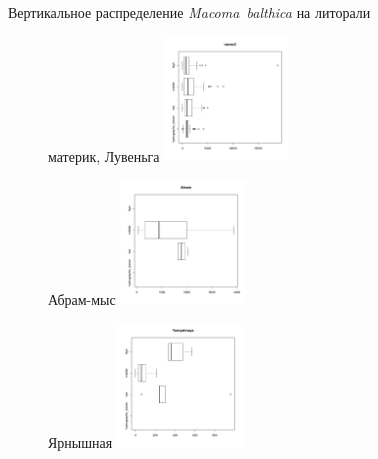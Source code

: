 \documentclass{beamer}
\begin{document}
\begin{frame}{Вертикальное распределение {\it Macoma~balthica} на литорали}
\begin{figure}
	\begin{minipage}[b]{.3\linewidth}
	\begin{center}
\tiny{материк, Лувеньга}
\includegraphics[width=33mm]{./Vertikal_strukture/razrez2_vertical.pdf}
	\end{center}
	\end{minipage}
	\hfil %
	\begin{minipage}[b]{.3\linewidth}
	\begin{center}
\tiny{Абрам-мыс}
\includegraphics[width=33mm]{./Vertikal_strukture/Abram_vertical.pdf}
	\end{center}
	\end{minipage}
	\hfil %
	\begin{minipage}[b]{.3\linewidth}
	\begin{center}
\tiny{Ярнышная}
\includegraphics[width=33mm]{./Vertikal_strukture/Yarnyshnaya_vertical.pdf}
	\end{center}
	\end{minipage}
\end{figure}
\end{frame}


\end{document}
